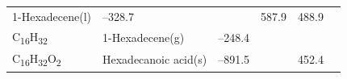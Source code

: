 \documentclass[
  9pt,
]{extbook}
\theoremstyle{definition}
\theoremstyle{definition}
\theoremstyle{definition}
\theoremstyle{remark}
\begin{document}
\begin{longtable}[]{@{}llllll@{}}
\begin{minipage}[t]{0.17\columnwidth}
1-Hexadecene(l)\strut
\end{minipage} & \begin{minipage}[t]{0.15\columnwidth}\raggedright
--328.7\strut
\end{minipage} & \begin{minipage}[t]{0.15\columnwidth}\raggedright
\strut
\end{minipage} & \begin{minipage}[t]{0.14\columnwidth}\raggedright
587.9\strut
\end{minipage} & \begin{minipage}[t]{0.14\columnwidth}\raggedright
488.9\strut
\end{minipage}\tabularnewline
\begin{minipage}[t]{0.07\columnwidth}\raggedright
C\textsubscript{16}H\textsubscript{32}\strut
\end{minipage} & \begin{minipage}[t]{0.17\columnwidth}\raggedright
1-Hexadecene(g)\strut
\end{minipage} & \begin{minipage}[t]{0.15\columnwidth}\raggedright
--248.4\strut
\end{minipage} & \begin{minipage}[t]{0.15\columnwidth}\raggedright
\strut
\end{minipage} & \begin{minipage}[t]{0.14\columnwidth}\raggedright
\strut
\end{minipage} & \begin{minipage}[t]{0.14\columnwidth}\raggedright
\strut
\end{minipage}\tabularnewline
\begin{minipage}[t]{0.07\columnwidth}\raggedright
C\textsubscript{16}H\textsubscript{32}O\textsubscript{2}\strut
\end{minipage} & \begin{minipage}[t]{0.17\columnwidth}\raggedright
Hexadecanoic acid(s)\strut
\end{minipage} & \begin{minipage}[t]{0.15\columnwidth}\raggedright
--891.5\strut
\end{minipage} & \begin{minipage}[t]{0.15\columnwidth}\raggedright
\strut
\end{minipage} & \begin{minipage}[t]{0.14\columnwidth}\raggedright
452.4\strut
\end{minipage} & \begin{minipage}[t]{0.14\columnwidth}\raggedright

\end{minipage}
\end{longtable}
\end{document}
